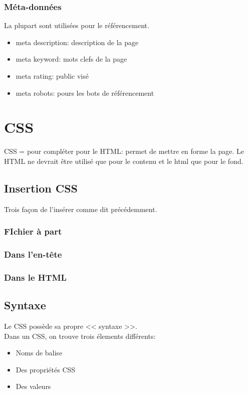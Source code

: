 \documentclass[12pt,a4paper,openany]{article}
\begin{document}
	\subsection{Méta-données}
		La plupart sont utilisées pour le référencement.
			
		\begin{itemize}
		\item meta description: description de la page
		\item meta keyword: mots clefs de la page
		\item meta rating: public visé
		\item meta robots: pours les bots de référencement
		\end{itemize}
			
	\chapter{CSS}
		CSS =  pour compléter pour le HTML: permet de mettre en forme la page.
		Le HTML ne devrait être utilisé que pour le contenu et le html que pour
		le fond.\\
		\section{Insertion CSS}	
		Trois façon de l'insérer comme dit précédemment. 
		\subsection{FIchier à part}
			
		\subsection{Dans l'en-tête}
			
		\subsection{Dans le HTML}
			
		\section{Syntaxe}
			Le CSS possède sa propre << syntaxe >>.\\
			Dans un CSS, on trouve trois élements différents: 
			\begin{itemize}
				\item Noms de balise
				\item Des propriétés CSS
				\item Des valeurs
			\end{itemize}
\end{document}
